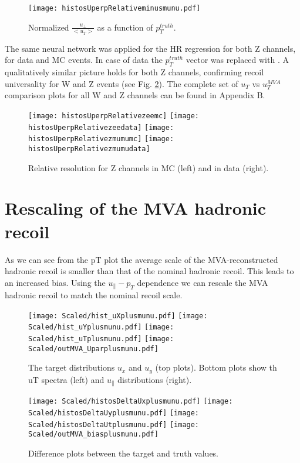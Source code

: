 	\begin{figure}[tph]
	\centering
	\texttt{[image: histosUperpRelativeminusmunu.pdf]}%
	\caption{Normalized $\frac{u_{\perp}}{<u_T>}$  as a function of $p_T^{truth}$.}
	\label{fig:uperp_relative}
\end{figure}
The same neural network was applied for the HR regression for both Z channels, for data and MC events. In case of data the $p_T^{truth}$ vector was replaced with \ptll. A qualitatively similar picture holds for both Z channels, confirming recoil universality for W and Z events (see Fig. \ref{fig:mva_Zbenchmark}). The complete set of $u_T$ vs $u_T^{MVA}$ comparison plots for all W and Z channels can be found in Appendix B.
	\begin{figure}[tph]
	\centering
	\texttt{[image: histosUperpRelativezeemc]}%
	\texttt{[image: histosUperpRelativezeedata]}
	\texttt{[image: histosUperpRelativezmumumc]}%
	\texttt{[image: histosUperpRelativezmumudata]}
	\caption{Relative resolution for Z channels in MC (left) and in data (right).}
	\label{fig:mva_Zbenchmark}
\end{figure}
\clearpage
\section{Rescaling of the MVA hadronic recoil }
As we can see from the pT plot the average scale of the MVA-reconstructed hadronic recoil is smaller than that of the nominal hadronic recoil. This leads to an increased bias. Using the $u_{\parallel}-p_T$ dependence we can rescale the MVA hadronic recoil to match the nominal recoil scale. 

	\begin{figure}[tph]
	\centering
	\texttt{[image: Scaled/hist\_uXplusmunu.pdf]}%
	\texttt{[image: Scaled/hist\_uYplusmunu.pdf]}
	\texttt{[image: Scaled/hist\_uTplusmunu.pdf]}%
	\texttt{[image: Scaled/outMVA\_Uparplusmunu.pdf]}
	\caption{The target distributions $u_x$ and $u_y$ (top plots). Bottom plots show th uT spectra (left) and $u_{\parallel}$ distributions (right).}
	\label{fig:mva_scaled_xy}
\end{figure}
\begin{figure}[tph]
		\centering
		\texttt{[image: Scaled/histosDeltaUxplusmunu.pdf]}%
		\texttt{[image: Scaled/histosDeltaUyplusmunu.pdf]}
		\texttt{[image: Scaled/histosDeltaUtplusmunu.pdf]}%
		\texttt{[image: Scaled/outMVA\_biasplusmunu.pdf]}
		\caption{Difference plots between the target and truth values.}
		\label{fig:mva_scaled_deltas}
\end{figure}

